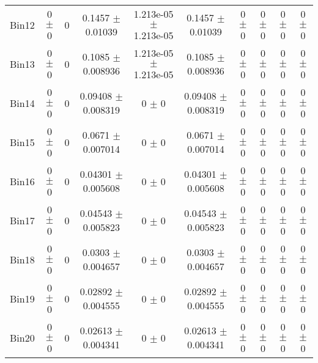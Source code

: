 \begin{tabular}{@{\extracolsep{4pt}}lccccccccc@{}}
     Bin12 & 0 $\pm$ 0 & 0 & 0.1457 $\pm$ 0.01039 & 1.213e-05 $\pm$ 1.213e-05 & 0.1457 $\pm$ 0.01039 & 0 $\pm$ 0 & 0 $\pm$ 0 & 0 $\pm$ 0 & 0 $\pm$ 0 \\ 
     Bin13 & 0 $\pm$ 0 & 0 & 0.1085 $\pm$ 0.008936 & 1.213e-05 $\pm$ 1.213e-05 & 0.1085 $\pm$ 0.008936 & 0 $\pm$ 0 & 0 $\pm$ 0 & 0 $\pm$ 0 & 0 $\pm$ 0 \\ 
     Bin14 & 0 $\pm$ 0 & 0 & 0.09408 $\pm$ 0.008319 & 0 $\pm$ 0 & 0.09408 $\pm$ 0.008319 & 0 $\pm$ 0 & 0 $\pm$ 0 & 0 $\pm$ 0 & 0 $\pm$ 0 \\ 
     Bin15 & 0 $\pm$ 0 & 0 & 0.0671 $\pm$ 0.007014 & 0 $\pm$ 0 & 0.0671 $\pm$ 0.007014 & 0 $\pm$ 0 & 0 $\pm$ 0 & 0 $\pm$ 0 & 0 $\pm$ 0 \\ 
     Bin16 & 0 $\pm$ 0 & 0 & 0.04301 $\pm$ 0.005608 & 0 $\pm$ 0 & 0.04301 $\pm$ 0.005608 & 0 $\pm$ 0 & 0 $\pm$ 0 & 0 $\pm$ 0 & 0 $\pm$ 0 \\ 
     Bin17 & 0 $\pm$ 0 & 0 & 0.04543 $\pm$ 0.005823 & 0 $\pm$ 0 & 0.04543 $\pm$ 0.005823 & 0 $\pm$ 0 & 0 $\pm$ 0 & 0 $\pm$ 0 & 0 $\pm$ 0 \\ 
     Bin18 & 0 $\pm$ 0 & 0 & 0.0303 $\pm$ 0.004657 & 0 $\pm$ 0 & 0.0303 $\pm$ 0.004657 & 0 $\pm$ 0 & 0 $\pm$ 0 & 0 $\pm$ 0 & 0 $\pm$ 0 \\ 
     Bin19 & 0 $\pm$ 0 & 0 & 0.02892 $\pm$ 0.004555 & 0 $\pm$ 0 & 0.02892 $\pm$ 0.004555 & 0 $\pm$ 0 & 0 $\pm$ 0 & 0 $\pm$ 0 & 0 $\pm$ 0 \\ 
     Bin20 & 0 $\pm$ 0 & 0 & 0.02613 $\pm$ 0.004341 & 0 $\pm$ 0 & 0.02613 $\pm$ 0.004341 & 0 $\pm$ 0 & 0 $\pm$ 0 & 0 $\pm$ 0 & 0 $\pm$ 0 \\ 
\hline\hline
  \end{tabular}
